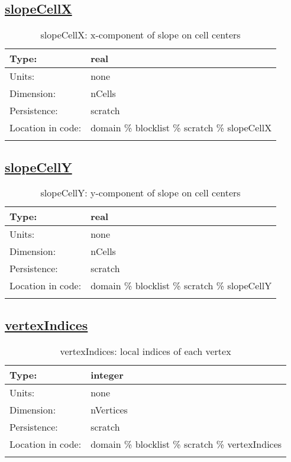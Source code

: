 \subsection[slopeCellX]{\hyperref[sec:var_tab_scratch]{slopeCellX}}
\label{subsec:var_sec_scratch_slopeCellX}
\begin{center}
\begin{longtable}{| p{2.0in} | p{4.0in} |}
        \hline 
        Type: & real \\
        \hline 
        Units: & \si{none} \\
        \hline 
        Dimension: & nCells \\
        \hline 
        Persistence: & scratch \\
        \hline 
         Location in code: & domain \% blocklist \% scratch \% slopeCellX \\
         \hline 
    \caption{slopeCellX: x-component of slope on cell centers}
\end{longtable}
\end{center}
\subsection[slopeCellY]{\hyperref[sec:var_tab_scratch]{slopeCellY}}
\label{subsec:var_sec_scratch_slopeCellY}
\begin{center}
\begin{longtable}{| p{2.0in} | p{4.0in} |}
        \hline 
        Type: & real \\
        \hline 
        Units: & \si{none} \\
        \hline 
        Dimension: & nCells \\
        \hline 
        Persistence: & scratch \\
        \hline 
         Location in code: & domain \% blocklist \% scratch \% slopeCellY \\
         \hline 
    \caption{slopeCellY: y-component of slope on cell centers}
\end{longtable}
\end{center}
\subsection[vertexIndices]{\hyperref[sec:var_tab_scratch]{vertexIndices}}
\label{subsec:var_sec_scratch_vertexIndices}
\begin{center}
\begin{longtable}{| p{2.0in} | p{4.0in} |}
        \hline 
        Type: & integer \\
        \hline 
        Units: & \si{none} \\
        \hline 
        Dimension: & nVertices \\
        \hline 
        Persistence: & scratch \\
        \hline 
         Location in code: & domain \% blocklist \% scratch \% vertexIndices \\
         \hline 
    \caption{vertexIndices: local indices of each vertex}
\end{longtable}
\end{center}
